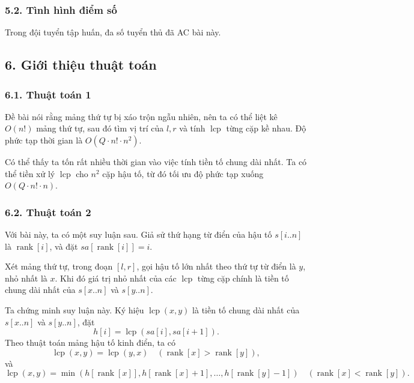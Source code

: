 \documentclass[11pt]{article}
\begin{document}
\subsubsection*{5.2. Tình hình điểm số}

Trong đội tuyển tập huấn, đa số tuyển thủ đã AC bài này.

\subsection*{6. Giới thiệu thuật toán}

\subsubsection*{6.1. Thuật toán 1}

Đề bài nói rằng mảng thứ tự bị xáo trộn ngẫu nhiên, nên ta có thể liệt kê
\(O(n!)\) mảng thứ tự, sau đó tìm vị trí của \(l,r\) và tính \(\operatorname{lcp}\)
từng cặp kề nhau. Độ phức tạp thời gian là \(O(Q\cdot n!\cdot n^2)\).

Có thể thấy ta tốn rất nhiều thời gian vào việc tính tiền tố chung dài nhất.
Ta có thể tiền xử lý \(\operatorname{lcp}\) cho \(n^2\) cặp hậu tố, từ đó tối
ưu độ phức tạp xuống \(O(Q\cdot n!\cdot n)\).

\subsubsection*{6.2. Thuật toán 2}

Với bài này, ta có một suy luận sau. Giả sử thứ hạng từ điển của hậu tố
\(s[i..n]\) là \(\operatorname{rank}[i]\), và đặt
\(sa[\operatorname{rank}[i]]=i\).

Xét mảng thứ tự, trong đoạn \([l,r]\), gọi hậu tố lớn nhất theo thứ tự từ điển
là \(y\), nhỏ nhất là \(x\). Khi đó giá trị nhỏ nhất của các
\(\operatorname{lcp}\) từng cặp chính là tiền tố chung dài nhất của \(s[x..n]\)
và \(s[y..n]\).

Ta chứng minh suy luận này. Ký hiệu \(\operatorname{lcp}(x,y)\) là tiền tố
chung dài nhất của \(s[x..n]\) và \(s[y..n]\), đặt
\[
  h[i]=\operatorname{lcp}(sa[i],sa[i+1]).
\]
Theo thuật toán mảng hậu tố kinh điển, ta có
\[
  \operatorname{lcp}(x,y)=\operatorname{lcp}(y,x)
  \quad(\operatorname{rank}[x]>\operatorname{rank}[y]),
\]
và
\[
  \operatorname{lcp}(x,y)=
  \min(h[\operatorname{rank}[x]],h[\operatorname{rank}[x]+1],\ldots,
  h[\operatorname{rank}[y]-1])
  \quad(\operatorname{rank}[x]<\operatorname{rank}[y]).
\]
\end{document}
